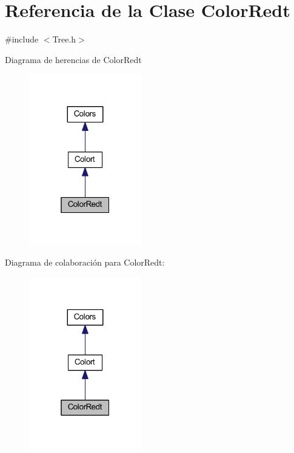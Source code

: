 \hypertarget{class_color_redt}{}\section{Referencia de la Clase Color\+Redt}
\label{class_color_redt}


{\ttfamily \#include $<$Tree.\+h$>$}



Diagrama de herencias de Color\+Redt
\nopagebreak
\begin{figure}[H]
\begin{center}
\leavevmode
\includegraphics[width=139pt]{class_color_redt__inherit__graph}
\end{center}
\end{figure}


Diagrama de colaboración para Color\+Redt\+:
\nopagebreak
\begin{figure}[H]
\begin{center}
\leavevmode
\includegraphics[width=139pt]{class_color_redt__coll__graph}
\end{center}
\end{figure}

